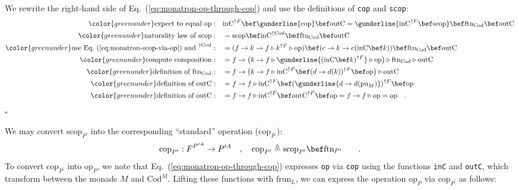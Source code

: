 We rewrite the right-hand side of Eq.~(\ref{eq:monatron-op-through-cop})
and use the definitions of \lstinline!cop! and \lstinline!scop!:
\begin{align*}
{\color{greenunder}\text{expect to equal }\text{op}:}\quad & \text{inC}^{\uparrow F}\bef\gunderline{\text{cop}}\bef\text{outC}=\gunderline{\text{inC}^{\uparrow F}\bef\text{scop}}\bef\text{ftn}_{\text{Cod}}\bef\text{outC}\\
{\color{greenunder}\text{naturality law of }\text{scop}:}\quad & =\text{scop}\bef\text{inC}^{\uparrow\text{Cod}}\bef\text{ftn}_{\text{Cod}}\bef\text{outC}\\
{\color{greenunder}\text{use Eq.~(\ref{eq:monatron-scop-via-op}) and }^{\uparrow\text{Cod}}:}\quad & =(f\rightarrow k\rightarrow f\triangleright k^{\uparrow F}\triangleright\text{op})\bef(c\rightarrow k\rightarrow c(\text{inC}\bef k))\bef\text{ftn}_{\text{Cod}}\bef\text{outC}\\
{\color{greenunder}\text{compute composition}:}\quad & =f\rightarrow\big(k\rightarrow f\triangleright\gunderline{(\text{inC}\bef k)^{\uparrow F}}\triangleright\text{op}\big)\triangleright\text{ftn}_{\text{Cod}}\triangleright\text{outC}\\
{\color{greenunder}\text{definition of }\text{ftn}_{\text{Cod}}:}\quad & =f\rightarrow\big(k\rightarrow f\triangleright\text{inC}^{\uparrow F}\bef(d\rightarrow d(k))^{\uparrow F}\bef\text{op}\big)\triangleright\text{outC}\\
{\color{greenunder}\text{definition of }\text{outC}:}\quad & =f\rightarrow f\triangleright\text{inC}^{\uparrow F}\bef(\gunderline{d\rightarrow d(\text{pu}_{M})})^{\uparrow F}\bef\text{op}\\
{\color{greenunder}\text{definition of }\text{outC}:}\quad & =f\rightarrow f\triangleright\text{inC}^{\uparrow F}\bef\text{outC}^{\uparrow F}\bef\text{op}=f\rightarrow f\triangleright\text{op}=\text{op}\quad.
\end{align*}
$\square$

We may convert $\text{scop}_{P^{\prime}}$ into the corresponding
\textsf{``}standard\textsf{''} operation ($\text{cop}_{P^{\prime}}$):
\[
\text{cop}_{P^{\prime}}:F^{P^{\prime A}}\rightarrow P^{\prime A}\quad,\quad\text{cop}_{P^{\prime}}\triangleq\text{scop}_{P^{\prime}}\bef\text{ftn}_{P^{\prime}}\quad\quad.
\]
To convert $\text{cop}_{P^{\prime}}$ into $\text{op}_{P}$, we note
that Eq.~(\ref{eq:monatron-op-through-cop}) expresses \lstinline!op!
via \lstinline!cop! using the functions \lstinline!inC! and \lstinline!outC!,
which transform between the monads $M$ and $\text{Cod}^{M}$. Lifting
these functions with $\text{frun}_{L}$, we can express the operation
$\text{op}_{P}$ via $\text{cop}_{P^{\prime}}$ as follows:%
\begin{comment}
precarious formatting
\end{comment}

